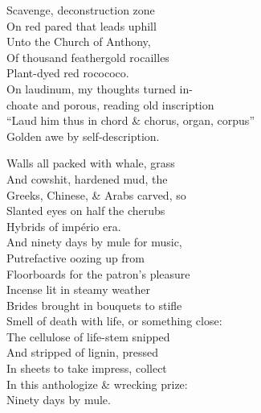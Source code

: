 Scavenge, deconstruction zone \\
On red pared that leads uphill \\
Unto the Church of Anthony, \\
Of thousand feathergold rocailles \\
Plant-dyed red rocococo. \\

On laudinum, my thoughts turned in- \\
choate and porous, reading old inscription \\
``Laud him thus in chord \& chorus, organ, corpus'' \\
Golden awe by self-description.

Walls all packed with whale, grass \\
And cowshit, hardened mud, the \\
Greeks, Chinese, \& Arabs carved, so \\
Slanted eyes on half the cherubs \\
Hybrids of império era. \\

And ninety days by mule for music, \\
Putrefactive oozing up from \\
Floorboards for the patron's pleasure \\
Incense lit in steamy weather \\
Brides brought in bouquets to stifle \\
Smell of death with life, or something close: \\
The cellulose of life-stem snipped \\
And stripped of lignin, pressed \\
In sheets to take impress, collect \\
In this anthologize \& wrecking prize: \\
Ninety days by mule.